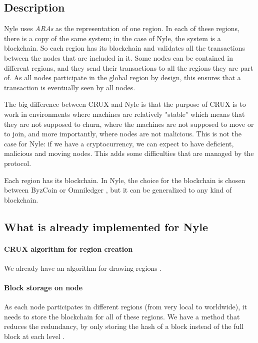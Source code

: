 \documentclass[a4paper,11pt,twoside,openright]{report}
\begin{document}
\subsection{Description}

Nyle uses \textit{ARAs} as the representation of one region. In each of these
regions, there is a copy of the same system; in the case of Nyle, the
system is a blockchain. So each region has its blockchain and validates
all the transactions between the nodes that are included in it. Some nodes can
be contained in different regions, and they send their transactions to all
the regions they are part of. As all nodes participate in the global region by
design, this ensures that a transaction is eventually seen by all nodes.

The big difference between CRUX \cite{Basescu2014} and Nyle is that the purpose
of CRUX \cite{Basescu2014} is to work in environments where machines are
relatively "stable" which means that they are not supposed to churn,
where the machines are not supposed to move or to join, and more importantly, where nodes are not malicious. This is not the case
for Nyle: if we have a cryptocurrency, we can expect to have deficient,
malicious and moving nodes. This adds some difficulties that are
managed by the protocol.

Each region has its blockchain. In Nyle, the choice for the blockchain is chosen between ByzCoin \cite{Kogias2016} or Omniledger
\cite{Kokoris-Kogias2017}, but it can be generalized to any kind of blockchain.

\subsection{What is already implemented for Nyle} \paragraph{CRUX algorithm for
region creation} We already have an algorithm for drawing regions
\cite{Basescu2014}.

\paragraph{Block storage on node} As each node participates in different
regions (from very local to worldwide), it needs to store the blockchain
for all of these regions. We have a method that reduces the redundancy, by only
storing the hash of a block instead of the full block at each level
\cite{Sierro2019}. 
\end{document}
